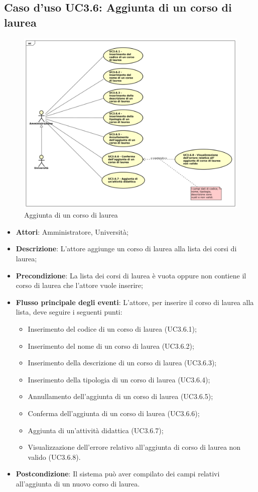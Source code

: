 \subsection{Caso d'uso \texorpdfstring{UC3.6}{UC3.6}: Aggiunta di un corso di laurea}
\begin{figure} [H]
	\centering
	\includegraphics[scale=0.45]{./img/UC3-6.pdf}
	\caption{Aggiunta di un corso di laurea}\label{}
\end{figure}
\begin{itemize}
	\item \textbf{Attori}: Amministratore, Università;
	\item \textbf{Descrizione}: L'attore aggiunge un corso di laurea alla lista dei corsi di laurea;
	\item \textbf{Precondizione}: La lista dei corsi di laurea è vuota oppure non contiene il corso di laurea che l'attore vuole inserire;
	\item \textbf{Flusso principale degli eventi}: L'attore, per inserire il corso di laurea alla lista, deve seguire i seguenti punti:
	\begin{itemize}
		\item Inserimento del codice di un corso di laurea (UC3.6.1);
		\item Inserimento del nome di un corso di laurea (UC3.6.2);
		\item Inserimento della descrizione di un corso di laurea (UC3.6.3);
		\item Inserimento della tipologia di un corso di laurea (UC3.6.4);
		\item Annullamento dell'aggiunta di un corso di laurea (UC3.6.5);
		\item Conferma dell’aggiunta di un corso di laurea (UC3.6.6);
		\item Aggiunta di un'attività didattica (UC3.6.7);
		\item Visualizzazione dell'errore relativo all’aggiunta di corso di laurea non valido (UC3.6.8).
	\end{itemize}
	\item \textbf{Postcondizione}: Il sistema può aver compilato dei campi relativi all'aggiunta di un nuovo corso di laurea.
\end{itemize}
